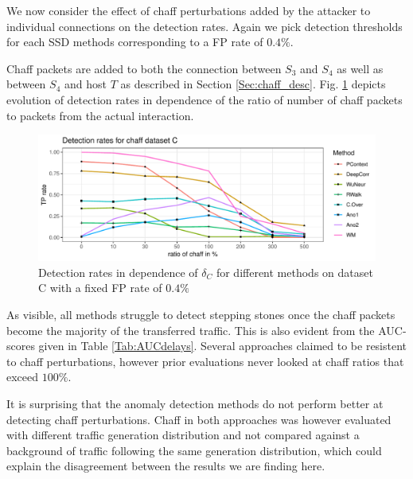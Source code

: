 \documentclass[runningheads]{llncs}\usepackage[]{graphicx}\usepackage[]{color}
\makeatletter
\def\maxwidth{ %
  \ifdim\Gin@nat@width>\linewidth
    \linewidth
  \else
    \Gin@nat@width
  \fi
}
\newenvironment{knitrout}{}{} %
\makeatother
\begin{document}
We now consider the effect of chaff perturbations added by the attacker to individual connections on the detection rates. Again we pick detection thresholds for each SSD methods corresponding to a FP rate of $0.4\%$.%

Chaff packets are added to both the connection between $S_3$ and $S_4$ as well as between $S_4$ and host $T$ as described in Section \ref{Sec:chaff_desc}. Fig. \ref{fig:Chaffdetection} depicts evolution of detection rates in dependence of the ratio of number of chaff packets to packets from the actual interaction.


\begin{knitrout}
\color{fgcolor}\begin{figure}
\includegraphics[width=\maxwidth]{figure/Chaffdetection-1} \caption[Detection rates in dependence of $\delta_C$ for different methods on dataset C with a fixed FP rate of $0.4\%$]{Detection rates in dependence of $\delta_C$ for different methods on dataset C with a fixed FP rate of $0.4\%$}\label{fig:Chaffdetection}
\end{figure}


\end{knitrout}

As visible, all methods struggle to detect stepping stones once the chaff packets become the majority of the transferred traffic. This is also evident from the AUC-scores given in Table \ref{Tab:AUCdelays}. Several approaches claimed to be resistent to chaff perturbations, however prior evaluations never looked at chaff ratios that exceed $100\%$. 

It is surprising that the anomaly detection methods do not perform better at detecting chaff perturbations. Chaff in both approaches was however evaluated with different traffic generation distribution and not compared against a background of traffic following the same generation distribution, which could explain the disagreement between the results we are finding here. 
\end{document}
